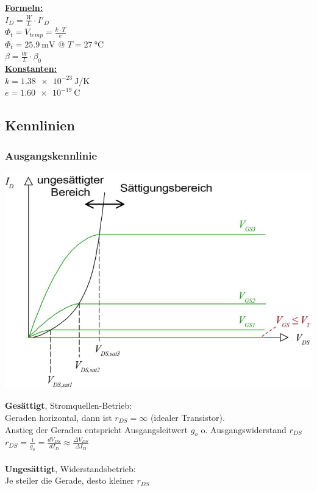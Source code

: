 \begin{minipage}[c]{0.24\textwidth}
	\uline{\textbf{Formeln:}}\\
	$I_D = \frac{W}{L}\cdot I'_D$\\
	$\Phi_t = V_{temp} = \frac{k\cdot T}{e}$\\
	$\Phi_t = \SI{25.9}{\milli\volt}$ @ $T = \SI{27}{\degreeCelsius}$\\
	$\beta = \frac{W}{L} \cdot \beta_0$ \\[2ex]
	\uline{\textbf{Konstanten:}}\\
	$k = \SI{1.38e-23}{\joule /\kelvin}$\\
	$e = \SI{1.60e-19}{\coulomb}$
\end{minipage}

\subsection{Kennlinien}
\subsubsection{Ausgangskennlinie}

\begin{minipage}[c]{0.35\textwidth}
	\includegraphics[width=1\linewidth]{chapters/Transistoren/images/Ausgangskennlinie}
\end{minipage}
\begin{minipage}[c]{0.65\textwidth}
	\textbf{Gesättigt}, Stromquellen-Betrieb:\\
	Geraden horizontal, dann ist $r_{DS} = \infty$ (idealer Transistor).\\
	Anstieg der Geraden entspricht Ausgangsleitwert $g_o$ o. Ausgangswiderstand $r_{DS}$\\
	$r_{DS} = \frac{1}{g_o} = \frac{dV_{DS}}{dI_D} \approx \frac{\Delta V_{DS}}{\Delta I_D}$\\ \\
	\textbf{Ungesättigt}, Widerstandsbetrieb:\\
	Je steiler die Gerade, desto kleiner $r_{DS}$
\end{minipage}

